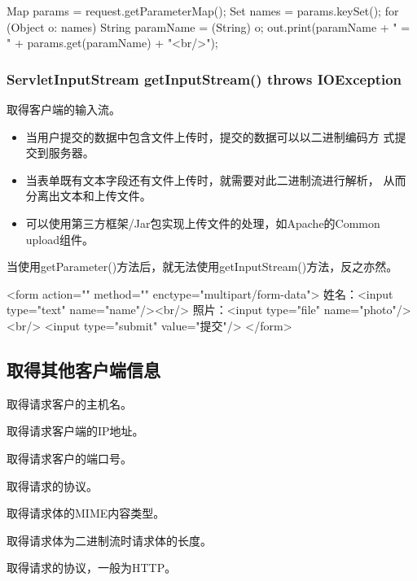 \begin{javaCode}
  Map params = request.getParameterMap();
  Set names = params.keySet();
  for (Object o: names) {
    String paramName = (String) o;
    out.print(paramName + " = " + params.get(paramName) + "<br/>");
  }
\end{javaCode}

\subsubsection{ServletInputStream getInputStream() throws IOException}

取得客户端的输入流。

\begin{itemize}
\item 当用户提交的数据中包含文件上传时，提交的数据可以以二进制编码方
  式提交到服务器。
\item 当表单既有文本字段还有文件上传时，就需要对此二进制流进行解析，
  从而分离出文本和上传文件。
\item 可以使用第三方框架/Jar包实现上传文件的处理，如{\kai\Blue Apache的Common
    upload组件}。
\end{itemize}


{\kai 当使用getParameter()方法后，就无法使用getInputStream()方法，反之亦然。}

\begin{xmlCode}
  <form action="" method="" enctype="multipart/form-data">
    姓名：<input type="text" name="name"/><br/>
    照片：<input type="file" name="photo"/><br/>
    <input type="submit" value="提交"/>
  </form>
\end{xmlCode}

\subsection{取得其他客户端信息} 

 取得请求客户的主机名。

 取得请求客户端的IP地址。

 取得请求客户的端口号。

 取得请求的协议。

 取得请求体的MIME内容类型。

 取得请求体为二进制流时请求体的长度。

 取得请求的协议，一般为HTTP。


